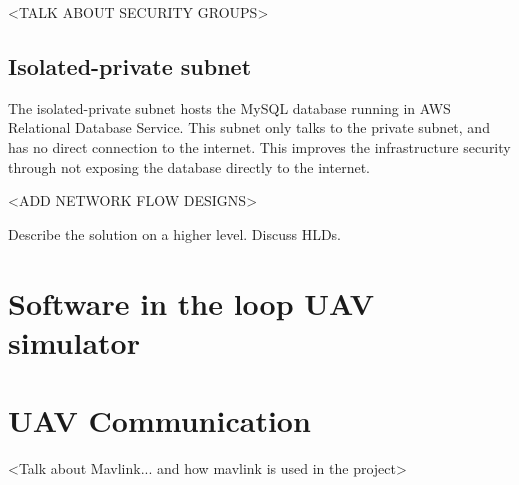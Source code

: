 <TALK ABOUT SECURITY GROUPS>




\subsection{Isolated-private subnet}
\label{isolated-private-subnet}

The isolated-private subnet hosts the MySQL database running in AWS Relational Database Service. This subnet only talks to the private subnet, and has no direct connection to the internet. This improves the infrastructure security through not exposing the database directly to the internet.

<ADD NETWORK FLOW DESIGNS>

Describe the solution on a higher level. Discuss HLDs.




\section{Software in the loop UAV simulator}
\label{sec:software-in-the-loop}




\section{UAV Communication}
<Talk about Mavlink... and how mavlink is used in the project>





